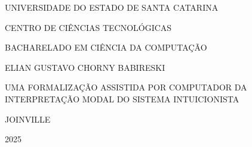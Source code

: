 UNIVERSIDADE DO ESTADO DE SANTA CATARINA

CENTRO DE CIÊNCIAS TECNOLÓGICAS

BACHARELADO EM CIÊNCIA DA COMPUTAÇÃO

ELIAN GUSTAVO CHORNY BABIRESKI

UMA FORMALIZAÇÃO ASSISTIDA POR COMPUTADOR DA INTERPRETAÇÃO MODAL DO SISTEMA INTUICIONISTA

JOINVILLE

2025
